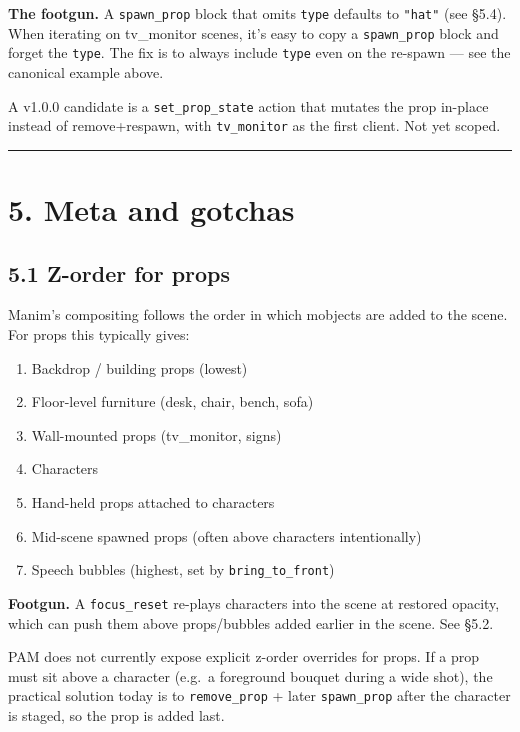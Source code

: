 \documentclass[
  11pt,
]{book}
\providecommand{\tightlist}{%
  \setlength{\itemsep}{0pt}\setlength{\parskip}{0pt}}
\begin{document}
\textbf{The footgun.} A \texttt{spawn\_prop} block that omits
\texttt{type} defaults to \texttt{"hat"} (see §5.4). When iterating on
tv\_monitor scenes, it's easy to copy a \texttt{spawn\_prop} block and
forget the \texttt{type}. The fix is to always include \texttt{type}
even on the re-spawn --- see the canonical example above.

A v1.0.0 candidate is a \texttt{set\_prop\_state} action that mutates
the prop in-place instead of remove+respawn, with \texttt{tv\_monitor}
as the first client. Not yet scoped.

\begin{center}\rule{0.5\linewidth}{0.5pt}\end{center}

\section{5. Meta and gotchas}\label{meta-and-gotchas}

\subsection{5.1 Z-order for props}\label{z-order-for-props}

Manim's compositing follows the order in which mobjects are added to the
scene. For props this typically gives:

\begin{enumerate}
\def\labelenumi{\arabic{enumi}.}
\tightlist
\item
  Backdrop / building props (lowest)
\item
  Floor-level furniture (desk, chair, bench, sofa)
\item
  Wall-mounted props (tv\_monitor, signs)
\item
  Characters
\item
  Hand-held props attached to characters
\item
  Mid-scene spawned props (often above characters intentionally)
\item
  Speech bubbles (highest, set by \texttt{bring\_to\_front})
\end{enumerate}

\textbf{Footgun.} A \texttt{focus\_reset} re-plays characters into the
scene at restored opacity, which can push them above props/bubbles added
earlier in the scene. See §5.2.

PAM does not currently expose explicit z-order overrides for props. If a
prop must sit above a character (e.g.~a foreground bouquet during a wide
shot), the practical solution today is to \texttt{remove\_prop} + later
\texttt{spawn\_prop} after the character is staged, so the prop is added
last.
\end{document}
